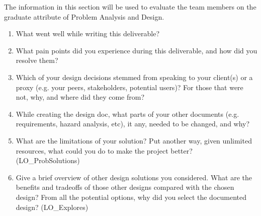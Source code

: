\documentclass[12pt, titlepage]{article}
\begin{document}
The information in this section will be used to evaluate the team members on the
graduate attribute of Problem Analysis and Design.



\begin{enumerate}
  \item What went well while writing this deliverable? 
  \item What pain points did you experience during this deliverable, and how
    did you resolve them?
  \item Which of your design decisions stemmed from speaking to your client(s)
  or a proxy (e.g. your peers, stakeholders, potential users)? For those that
  were not, why, and where did they come from?
  \item While creating the design doc, what parts of your other documents (e.g.
  requirements, hazard analysis, etc), it any, needed to be changed, and why?
  \item What are the limitations of your solution?  Put another way, given
  unlimited resources, what could you do to make the project better? (LO\_ProbSolutions)
  \item Give a brief overview of other design solutions you considered.  What
  are the benefits and tradeoffs of those other designs compared with the chosen
  design?  From all the potential options, why did you select the documented design?
  (LO\_Explores)
\end{enumerate}
\end{document}
